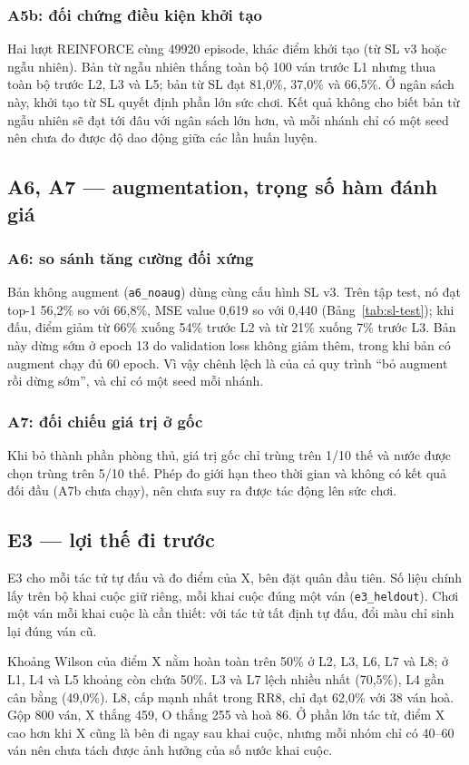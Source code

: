 \subsubsection{A5b: đối chứng điều kiện khởi tạo}

Hai lượt REINFORCE cùng \num{49920} episode, khác điểm khởi tạo (từ SL v3 hoặc ngẫu nhiên). Bản từ ngẫu nhiên thắng toàn bộ 100 ván trước L1 nhưng thua toàn bộ trước L2, L3 và L5; bản từ SL đạt 81{,}0\%, 37{,}0\% và 66{,}5\%. Ở ngân sách này, khởi tạo từ SL quyết định phần lớn sức chơi. Kết quả không cho biết bản từ ngẫu nhiên sẽ đạt tới đâu với ngân sách lớn hơn, và mỗi nhánh chỉ có một seed nên chưa đo được độ dao động giữa các lần huấn luyện.

\subsection{A6, A7 --- augmentation, trọng số hàm đánh giá}
\subsubsection{A6: so sánh tăng cường đối xứng}

Bản không augment (\texttt{a6\_noaug}) dùng cùng cấu hình SL v3. Trên tập test, nó đạt top-1 56{,}2\% so với 66{,}8\%, MSE value 0{,}619 so với 0{,}440 (Bảng~\ref{tab:sl-test}); khi đấu, điểm giảm từ 66\% xuống 54\% trước L2 và từ 21\% xuống 7\% trước L3. Bản này dừng sớm ở epoch 13 do validation loss không giảm thêm, trong khi bản có augment chạy đủ 60 epoch. Vì vậy chênh lệch là của cả quy trình ``bỏ augment rồi dừng sớm'', và chỉ có một seed mỗi nhánh.

\subsubsection{A7: đối chiếu giá trị ở gốc}

Khi bỏ thành phần phòng thủ, giá trị gốc chỉ trùng trên 1/10 thế và nước được chọn trùng trên 5/10 thế. Phép đo giới hạn theo thời gian và không có kết quả đối đầu (A7b chưa chạy), nên chưa suy ra được tác động lên sức chơi.

\subsection{E3 --- lợi thế đi trước}
\label{sec:e3}
E3 cho mỗi tác tử tự đấu và đo điểm của X, bên đặt quân đầu tiên. Số liệu chính lấy trên bộ khai cuộc giữ riêng, mỗi khai cuộc đúng một ván (\texttt{e3\_heldout}). Chơi một ván mỗi khai cuộc là cần thiết: với tác tử tất định tự đấu, đổi màu chỉ sinh lại đúng ván cũ.

Khoảng Wilson của điểm X nằm hoàn toàn trên 50\% ở L2, L3, L6, L7 và L8; ở L1, L4 và L5 khoảng còn chứa 50\%. L3 và L7 lệch nhiều nhất (70{,}5\%), L4 gần cân bằng (49{,}0\%). L8, cấp mạnh nhất trong RR8, chỉ đạt 62{,}0\% với 38 ván hoà. Gộp 800 ván, X thắng 459, O thắng 255 và hoà 86. Ở phần lớn tác tử, điểm X cao hơn khi X cũng là bên đi ngay sau khai cuộc, nhưng mỗi nhóm chỉ có 40--60 ván nên chưa tách được ảnh hưởng của số nước khai cuộc.

